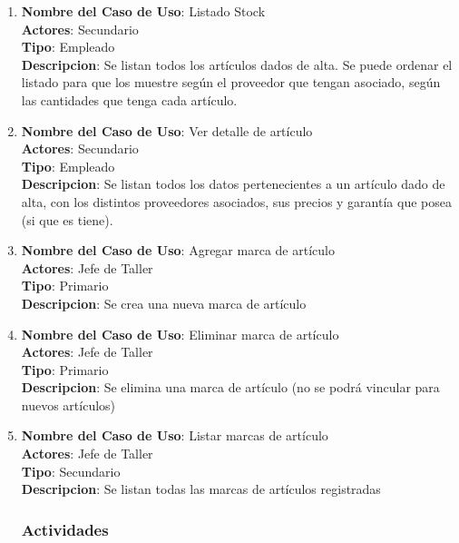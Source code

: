 \documentclass[12pt]{extarticle}
\begin{document}
\begin{spacing}{1.2}
\begin{enumerate}
        \item 	\textbf{Nombre del Caso de Uso}: Listado Stock\\
                \textbf{Actores}: Secundario\\
                \textbf{Tipo}: Empleado\\
                \textbf{Descripcion}: Se listan todos los artículos dados de alta. Se puede ordenar el listado para que los muestre según el proveedor que tengan asociado, según las cantidades que tenga cada artículo. 

        \item 	\textbf{Nombre del Caso de Uso}: Ver detalle de artículo\\
                \textbf{Actores}: Secundario\\
                \textbf{Tipo}: Empleado\\
                \textbf{Descripcion}: Se listan todos los datos pertenecientes a un artículo dado de alta, con los distintos proveedores asociados, sus precios y garantía que posea (si que es tiene).

        \item 	\textbf{Nombre del Caso de Uso}: Agregar marca de artículo\\
                \textbf{Actores}: Jefe de Taller\\
                \textbf{Tipo}: Primario\\
                \textbf{Descripcion}: Se crea una nueva marca de artículo

        \item 	\textbf{Nombre del Caso de Uso}: Eliminar marca de artículo\\
                \textbf{Actores}: Jefe de Taller\\
                \textbf{Tipo}: Primario\\
                \textbf{Descripcion}: Se elimina una marca de artículo (no se podrá vincular para nuevos artículos)

        \item 	\textbf{Nombre del Caso de Uso}: Listar marcas de artículo\\
                \textbf{Actores}: Jefe de Taller\\
                \textbf{Tipo}: Secundario\\
                \textbf{Descripcion}: Se listan todas las marcas de artículos registradas	



        \subsubsection{Actividades}




\end{enumerate}
\end{spacing}
\end{document}
